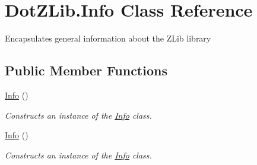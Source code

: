 \hypertarget{class_dot_z_lib_1_1_info}{}\section{Dot\+Z\+Lib.\+Info Class Reference}
\label{class_dot_z_lib_1_1_info}


Encapsulates general information about the Z\+Lib library  


\subsection*{Public Member Functions}
\begin{DoxyCompactItemize}
\item 
\hyperlink{class_dot_z_lib_1_1_info_a48b690fe56ca7cc8e8a40a740476696b}{Info} ()
\begin{DoxyCompactList}\small\item\em Constructs an instance of the {\ttfamily \hyperlink{class_dot_z_lib_1_1_info}{Info}} class. \end{DoxyCompactList}\item 
\hyperlink{class_dot_z_lib_1_1_info_a48b690fe56ca7cc8e8a40a740476696b}{Info} ()
\begin{DoxyCompactList}\small\item\em Constructs an instance of the {\ttfamily \hyperlink{class_dot_z_lib_1_1_info}{Info}} class. \end{DoxyCompactList}\end{DoxyCompactItemize}
